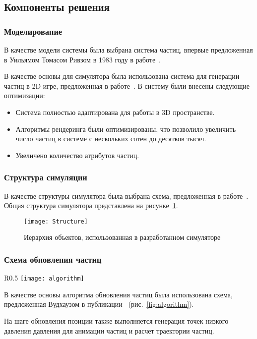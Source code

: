 \subsection{Компоненты решения}
\begin{frame}
\frametitle{Моделирование}
В качестве модели системы была выбрана система частиц, впервые предложенная в
Уильямом Томасом Ривзом в 1983 году в работе~\cite{reewes1983}.

В качестве основы для симулятора была использована система для генерации частиц
в 2D игре, предложенная в работе~\cite{LearnOGL}. В систему были внесены
следующие оптимизации:
\begin{itemize}
    \item Система полностью адаптирована для работы в 3D пространстве.
    \item Алгоритмы рендеринга были оптимизированы, что позволило увеличить
        число частиц в системе с нескольких сотен до десятков тысяч.
    \item Увеличено количество атрибутов частиц.
\end{itemize}
\end{frame}

\begin{frame}
\frametitle{Структура симуляции}
В качестве структуры симулятора была выбрана схема, предложенная
в работе~\cite{Somasekaran2005UsingPS}. Общая структура симулятора представлена
на рисунке~\ref{fig:simStructure}.
\begin{figure}[htb]
	\centering
	\texttt{[image: Structure]}
    \caption{Иерархия объектов, использованная в разработанном симуляторе}%
    \label{fig:simStructure}
\end{figure}
\end{frame}

\begin{frame}[t]
\frametitle{Схема обновления частиц}
\begin{wrapfigure}{R}{0.5\textwidth}
	\centering
	\texttt{[image: algorithm]}
    \caption{Схема обновления частиц в кадре}%
    \label{fig:algorithm}
\end{wrapfigure}
В качестве основы алгоритма обновления частиц была использована схема,
предложенная Вудхаузом в публикации~\cite{Woodhouse} (рис.~\ref{fig:algorithm}).

На шаге обновления позиции также выполняется генерация точек низкого давления
давления для анимации частиц и расчет траектории частиц.
\end{frame}

